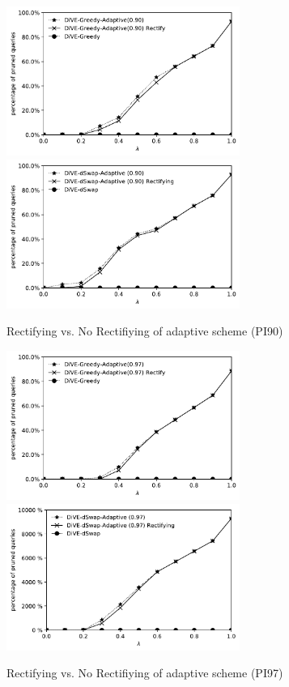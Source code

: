 \documentclass{article}
\begin{document}
\begin{figure}
	\begin{center}
		\vspace{-20pt}
		\includegraphics[width=3.0in]{figures/pruning_performance_greedy_adaptive_rectifying_90}
		\includegraphics[width=3.0in]{figures/pruning_performance_dswap_adaptive_rectifying_90}
		\caption{Rectifying vs. No Rectifiying of adaptive scheme (PI90)}
		\label{fig:rectifying_bound_greedy_dswap90}
	\end{center}
\end{figure}

\begin{figure}
	\begin{center}
		\vspace{-20pt}
		\includegraphics[width=3.0in]{figures/pruning_performance_greedy_adaptive_rectifying_97}
		\includegraphics[width=3.0in]{figures/pruning_performance_dswap_adaptive_rectifying_97}
		\caption{Rectifying vs. No Rectifiying of adaptive scheme (PI97)}
		\label{fig:rectifying_bound_greedy_dswap97}
	\end{center}
\end{figure}
\end{document}
